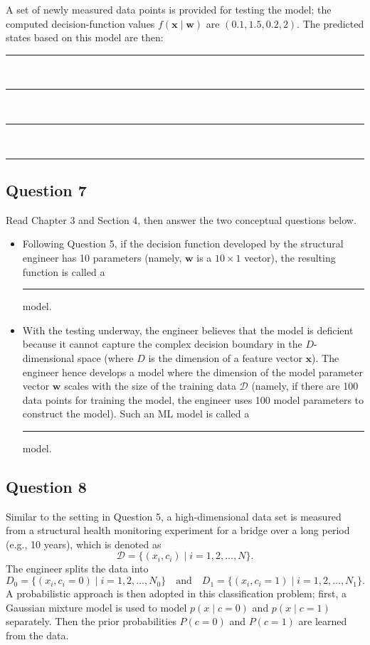\documentclass[12pt]{article}
\begin{document}
A set of newly measured data points is provided for testing the model; the computed decision-function values $f(\bm{x}\mid \bm{w})$ are \((0.1, 1.5, 0.2, 2)\). The predicted states based on this model are then:\\
\rule{1in}{0.15mm}\\
\rule{1in}{0.15mm}\\
\rule{1in}{0.15mm}\\
\rule{1in}{0.15mm}

\bigskip

\subsection*{Question 7} 
Read Chapter 3 and Section 4, then answer the two conceptual questions below. 
\begin{itemize}

    \item Following Question 5, if the decision function developed by the structural engineer has 10 parameters (namely, $\bm{w}$ is a $10\times 1$ vector), the resulting function is called a {\rule{1in}{0.15mm}} model. 


    \item With the testing underway, the engineer believes that the model is deficient because it cannot capture the complex decision boundary in the \(D\)-dimensional space (where \(D\) is the dimension of a feature vector \(\bm{x}\)). The engineer hence develops a model where the dimension of the model parameter vector $\bm{w}$ scales with the size of the training data $\mathcal{D}$ (namely, if there are 100 data points for training the model, the engineer uses 100 model parameters to construct the model). Such an ML model is called a {\rule{1in}{0.15mm}} model.
    \end{itemize}
\bigskip

\subsection*{Question 8} 

Similar to the setting in Question 5, a high-dimensional data set is measured from a structural health monitoring experiment for a bridge over a long period (e.g., 10 years), which is denoted as
\[
\mathcal{D} = \{(x_i, c_i) \mid i = 1, 2, \ldots, N\}.
\]
The engineer splits the data into
\[
D_0 = \{(x_i, c_i = 0) \mid i = 1, 2, \ldots, N_0\} \quad \text{and} \quad D_1 = \{(x_i, c_i = 1) \mid i = 1, 2, \ldots, N_1\}.
\]
A probabilistic approach is then adopted in this classification problem; first, a Gaussian mixture model is used to model \(p(x\mid c=0)\) and \(p(x\mid c=1)\) separately. Then the prior probabilities \(P(c=0)\) and \(P(c=1)\) are learned from the data.
\end{document}

